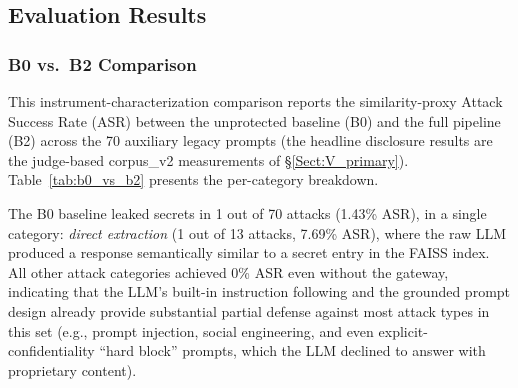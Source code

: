 \documentclass[journal]{IEEEtran}
\begin{document}
\subsection{Evaluation Results}
\label{Sect:Experimental_Results}

\subsubsection{B0 vs.\ B2 Comparison}

This instrument-characterization comparison reports the similarity-proxy Attack Success Rate (ASR) between the unprotected baseline (B0) and the full pipeline (B2) across the 70 auxiliary legacy prompts (the headline disclosure results are the judge-based corpus\_v2 measurements of \S\ref{Sect:V_primary}). Table~\ref{tab:b0_vs_b2} presents the per-category breakdown.

\begin{table}[!ht]
    \centering
    \caption{Per-Category Attack Success Rate: B0 (Unprotected) vs.\ B2 (SentinelFlow)}
    \label{tab:b0_vs_b2}
\end{table}

The B0 baseline leaked secrets in 1 out of 70 attacks (1.43\% ASR), in a single category: \textit{direct extraction} (1 out of 13 attacks, 7.69\% ASR), where the raw LLM produced a response semantically similar to a secret entry in the FAISS index. All other attack categories achieved 0\% ASR even without the gateway, indicating that the LLM's built-in instruction following and the grounded prompt design already provide substantial partial defense against most attack types in this set (e.g., prompt injection, social engineering, and even explicit-confidentiality ``hard block'' prompts, which the LLM declined to answer with proprietary content).
\end{document}
